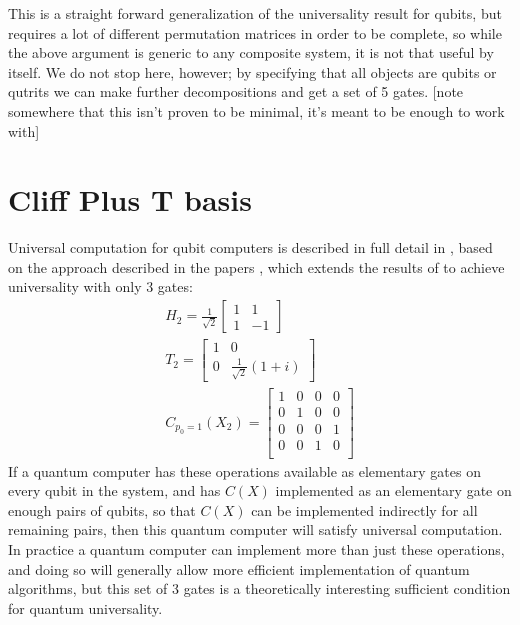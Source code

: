 \documentclass[]{article}
\begin{document}
This is a straight forward generalization of the universality result for qubits, but requires a lot of different permutation matrices in order to be complete, so while the above argument is generic to any composite system, it is not that useful by itself. We do not stop here, however; by specifying that all objects are qubits or qutrits we can make further decompositions and get a set of 5 gates. [note somewhere that this isn't proven to be minimal, it's meant to be enough to work with]

\section{Cliff Plus T basis}
Universal computation for qubit computers is described in full detail in \cite{textbook}, based on the approach described in the papers \cite{universal-qubit}, which extends the results of \cite{cnot-decomposition} to achieve universality with only 3 gates:
\begin{align*}
	H_2 = \frac{1}{\sqrt{2}}\left[\begin{matrix}
		1 & 1 \\
		1 & -1
	\end{matrix}\right]
	\\
	T_2 = \left[\begin{matrix}
		1 & 0 \\
		0 & \frac{1}{\sqrt{2}}\left(1+ i\right)
	\end{matrix}\right]
	\\
	C_{p_0=1}(X_2) = \left[\begin{matrix}
		1 & 0 & 0 & 0 \\
		0 & 1 & 0 & 0 \\
		0 & 0 & 0 & 1 \\
		0 & 0 & 1 & 0 \\
	\end{matrix}\right]
\end{align*}
If a quantum computer has these operations available as elementary gates on every qubit in the system, and has $C(X)$ implemented as an elementary gate on enough pairs of qubits, so that $C(X)$ can be implemented indirectly for all remaining pairs, then this quantum computer will satisfy universal computation. In practice a quantum computer can implement more than just these operations, and doing so will generally allow more efficient implementation of quantum algorithms, but this set of 3 gates is a theoretically interesting sufficient condition for quantum universality.
\end{document}
